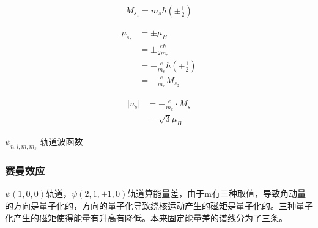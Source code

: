 \begin{align*}
    M_{s_z} = m_s \hbar (\pm \frac{1}{2})
\end{align*}


\begin{align*}
    \mu_{s_z} &= \pm \mu_B \\
    &= \pm \frac{e\hbar}{2m_e} \\ 
    &= -\frac{e}{m_e} \hbar (\mp \frac{1}{2}) \\ 
    &= -\frac{e}{m_e} M_{s_z} 
\end{align*}

\begin{align*}
    |u_s| &= -\frac{e}{m_e} \cdot M_s \\ 
    &= \sqrt{3} \mu_B
\end{align*}

$\psi_{n,l,m,m_s}$ 轨道波函数



\subsubsection{赛曼效应}

$\psi(1, 0, 0)$轨道，$\psi(2, 1, \pm 1, 0)$轨道算能量差，由于m有三种取值，导致角动量的方向是量子化的，方向的量子化导致绕核运动产生的磁矩是量子化的。三种量子化产生的磁矩使得能量有升高有降低。本来固定能量差的谱线分为了三条。
